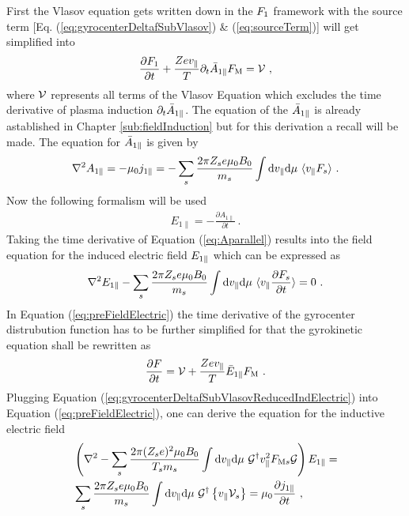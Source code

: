 First the Vlasov equation gets written down in the $F_1$ framework with the source term [Eq. (\ref{eq:gyrocenterDeltafSubVlasov}) \& (\ref{eq:sourceTerm})] will get simplified into 
\begin{gather}
    \frac{\partial F_1}{\partial t} + \frac{Ze v_\parallel}{T} \partial_t \bar{A}_{1\parallel} F_\mathrm{M} = \mathcal{V}~,
    \label{eq:gyrocenterDeltafSubVlasovReduced}
\end{gather}
where $\mathcal{V}$ represents all terms of the Vlasov Equation which excludes the time derivative of plasma induction $\partial_t \bar{A}_{1\parallel}$. The equation of the $\bar{A}_{1\parallel}$ is already astablished in Chapter \ref{sub:fieldInduction} but for this derivation a recall will be made. The equation for $\bar{A}_{1\parallel}$ is given by
\begin{gather}
    \nabla^2 A_{1 \parallel} = - \mu_0 j_{1\parallel} = - \sum_s \frac{2\pi Z_se \mu_0 B_0}{m_s} \int \mathrm{d}v_\parallel\mathrm{d}\mu ~ \langle v_\parallel F_s\rangle~.
    \label{eq:Aparallel}
\end{gather}
Now the following formalism will be used
\begin{gather}
	E_{1\parallel} = - \frac{\partial A_{1\parallel}}{\partial t}~.
\end{gather}
Taking the time derivative of Equation (\ref{eq:Aparallel}) results into the field equation for the induced electric field $
E_{1\parallel}$ which can be expressed as
\begin{gather}
	\nabla^2 E_{1\parallel} - \sum_s \frac{2\pi Z_se \mu_0 B_0}{m_s} \int \mathrm{d}v_\parallel\mathrm{d}\mu ~ \langle v_\parallel \frac{\partial F_s}{\partial t}\rangle = 0 ~.
	\label{eq:preFieldElectric}
\end{gather}
In Equation (\ref{eq:preFieldElectric}) the time derivative of the gyrocenter distrubution function has to be further simplified for that the gyrokinetic equation shall be rewritten as 
\begin{gather}
	\frac{\partial F}{\partial t} = \mathcal{V} + \frac{Ze v_\parallel}{T} \bar{E}_{1\parallel} F_\mathrm{M}~.
	\label{eq:gyrocenterDeltafSubVlasovReducedIndElectric}
\end{gather}
Plugging Equation (\ref{eq:gyrocenterDeltafSubVlasovReducedIndElectric}) into Equation (\ref{eq:preFieldElectric}), one can derive the equation for the inductive electric field 
\begin{gather}
	\begin{aligned}
		&\left(\nabla^2 - \sum_s \frac{2\pi (Z_se)^2 \mu_0 B_0}{T_sm_s} \int \mathrm{d}v_\parallel\mathrm{d}\mu ~ \mathcal{G}^\dagger v_\parallel^2 F_{\mathrm{M}s} \mathcal{G}\right) E_{1\parallel} = \\
		&\sum_s \frac{2\pi Z_se \mu_0 B_0}{m_s}  \int \mathrm{d}v_\parallel\mathrm{d}\mu ~ \mathcal{G}^\dagger \left\{v_\parallel \mathcal{V}_s\right\} = \mu_0 \frac{\partial j_{1\parallel}}{\partial t}~,
	\end{aligned}
	\label{eq:fieldElectric}
\end{gather}
